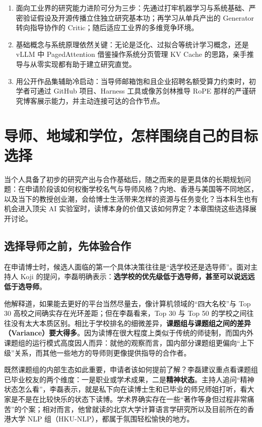 \documentclass[UTF8,a4paper,11pt,fontset=fandol]{ctexart}
\begin{document}
\begin{enumerate}
\item 面向工业界的研究能力进阶可分为三步：先通过打牢机器学习与系统基础、严密验证假设及开源传播立住独立研究基本功；再学习从单兵产出的 Generator 转向指导协作的 Critic；随后适应工业界的多维竞争环境。
\item 基础概念与系统原理依然关键：无论是泛化、过拟合等统计学习概念，还是 vLLM 中 PagedAttention 借鉴操作系统分页管理 KV Cache 的思路，亲手推导与从零实现都有助于建立研究直觉。
\item 用公开作品集辅助冷启动：当导师邮箱饱和且企业招聘名额受算力约束时，初学者可通过 GitHub 项目、Harness 工具或像苏剑林推导 RoPE 那样的严谨研究博客展示能力，并主动连接可达的合作节点。
\end{enumerate}
\section{导师、地域和学位，怎样围绕自己的目标选择}
当个人具备了初步的研究产出与合作基础后，随之而来的是更具体的长期规划问题：在申请阶段该如何权衡学校名气与导师风格？内地、香港与美国等不同地区，以及当下的教授创业潮，会给博士生活带来怎样的资源与任务变化？当本科生也有机会进入顶尖 AI 实验室时，读博本身的价值又该如何界定？本章围绕这些选择展开讨论。
\subsection{选择导师之前，先体验合作}
在申请博士时，候选人面临的第一个具体决策往往是“选学校还是选导师”。面对主持人 Koji 的提问，李磊明确表示：\textbf{选学校的优先级低于选导师，甚至可以说远远低于选导师}。

他解释道，如果能去更好的平台当然尽量去，像计算机领域的“四大名校”与 Top 30 高校之间确实存在光环差距；但在李磊看来，Top 30 与 Top 50 的学校之间往往没有太大本质区别。相比于学校排名的细微差异，\textbf{课题组与课题组之间的差异（Variance）要大得多}。因为读博在很大程度上类似于传统的师徒制，而国内外课题组的运行模式高度因人而异：就他的观察而言，国内部分课题组更偏向“上下级”关系，而其他一些地方的导师则更像提供指导的合作者。

既然课题组的内部生态如此重要，申请者该如何提前了解？李磊建议重点看课题组已毕业校友的两个维度：一是职业或学术成果，二是\textbf{精神状态}。主持人追问“精神状态怎么看”，李磊表示，就是私下向在读博士生和已毕业的师兄师姐打听，看大家是不是在比较快乐的状态下读博。学术界确实存在一些“著作等身但过程非常痛苦”的个案；相对而言，他曾就读的北京大学计算语言学研究所以及目前所在的香港大学 NLP 组（HKU-NLP），都属于氛围轻松愉快的地方。
\end{document}
